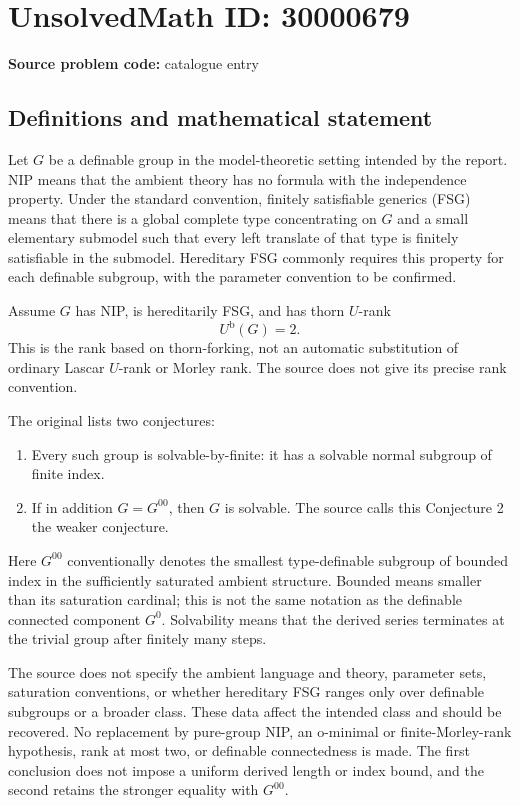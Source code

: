 \documentclass[11pt]{article}
\begin{document}
\section*{UnsolvedMath ID: 30000679}
\textbf{Source problem code:} catalogue entry
\subsection{Definitions and mathematical statement}
Let $G$ be a definable group in the model-theoretic setting intended by the report. NIP means that the ambient theory has no formula with the independence property. Under the standard convention, finitely satisfiable generics (FSG) means that there is a global complete type concentrating on $G$ and a small elementary submodel such that every left translate of that type is finitely satisfiable in the submodel. Hereditary FSG commonly requires this property for each definable subgroup, with the parameter convention to be confirmed.

Assume $G$ has NIP, is hereditarily FSG, and has thorn $U$-rank
\[
 U^{\mathrm b}(G)=2.
\]
This is the rank based on thorn-forking, not an automatic substitution of ordinary Lascar $U$-rank or Morley rank. The source does not give its precise rank convention.

The original lists two conjectures:
\begin{enumerate}
\item Every such group is solvable-by-finite: it has a solvable normal subgroup of finite index.
\item If in addition $G=G^{00}$, then $G$ is solvable. The source calls this Conjecture 2 the weaker conjecture.
\end{enumerate}
Here $G^{00}$ conventionally denotes the smallest type-definable subgroup of bounded index in the sufficiently saturated ambient structure. Bounded means smaller than its saturation cardinal; this is not the same notation as the definable connected component $G^0$. Solvability means that the derived series terminates at the trivial group after finitely many steps.

The source does not specify the ambient language and theory, parameter sets, saturation conventions, or whether hereditary FSG ranges only over definable subgroups or a broader class. These data affect the intended class and should be recovered. No replacement by pure-group NIP, an o-minimal or finite-Morley-rank hypothesis, rank at most two, or definable connectedness is made. The first conclusion does not impose a uniform derived length or index bound, and the second retains the stronger equality with $G^{00}$.
\end{document}
